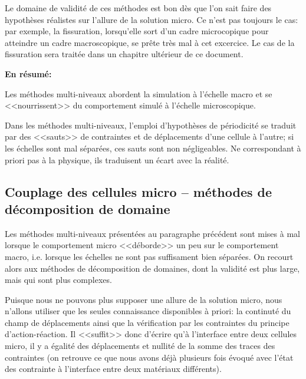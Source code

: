 Le domaine de validité de ces méthodes est bon dès que l'on sait faire des hypothèses
réalistes sur l'allure de la solution micro. Ce n'est pas toujours le cas: par exemple, la fissuration,
lorsqu'elle sort d'un cadre microcopique pour atteindre un cadre macroscopique, se prête
très mal à cet excercice.
Le cas de la fissuration sera traitée dans un chapitre ultérieur de ce document.

\medskip{}
\textbf{En résumé:}

Les méthodes multi-niveaux abordent la simulation à l'échelle macro 
et se <<nourrissent>>  du comportement simulé à l'échelle microscopique.

Dans les méthodes multi-niveaux, l'emploi d'hypothèses de périodicité se traduit par 
des <<sauts>> de contraintes et de déplacements d'une cellule à l'autre; si les échelles sont 
mal séparées, ces sauts sont non négligeables. Ne correspondant à priori pas à la physique, 
ils traduisent un écart avec la réalité.



\medskip
\subsection{Couplage des cellules micro -- méthodes de décomposition de domaine}\label{Sec-dec}

Les méthodes multi-niveaux présentées au paragraphe précédent sont mises à mal
lorsque le comportement micro <<déborde>> un peu sur le comportement macro, i.e.
lorsque les échelles ne sont pas suffisament bien séparées.
On recourt alors aux méthodes de décomposition de domaines, 
dont la validité est plus large, mais qui sont plus complexes.

\medskip
Puisque nous ne pouvons plus supposer une allure de la solution micro, 
nous n'allons utiliser que les seules connaissance disponibles à priori: la continuté du champ de déplacements
ainsi que la vérification par les contraintes du principe d'action-réaction. Il <<suffit>> donc
d'écrire qu'à l'interface entre deux cellules micro, il y a égalité des déplacements et
nullité de la somme des traces des contraintes (on retrouve ce que nous avons déjà
plusieurs fois évoqué avec l'état des contrainte à l'interface entre deux matériaux
différents).

